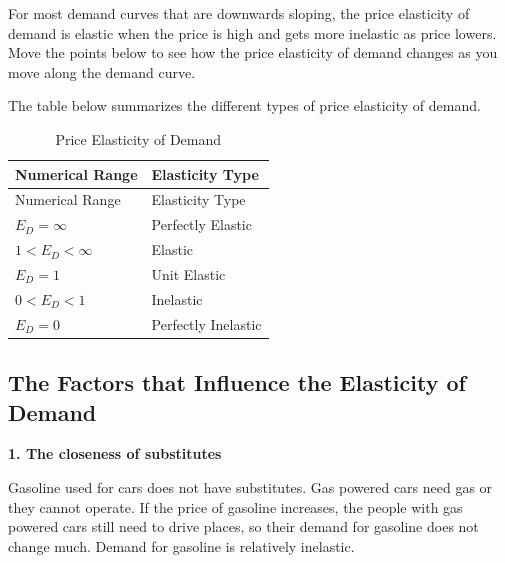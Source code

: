 \documentclass[
]{book}
\begin{document}
For most demand curves that are downwards sloping, the price elasticity of demand is elastic when the price is high and gets more inelastic as price lowers. Move the points below to see how the price elasticity of demand changes as you move along the demand curve.

The table below summarizes the different types of price elasticity of demand.

\begin{longtable}[]{@{}
  >{\centering\arraybackslash}p{}
  >{\centering\arraybackslash}p{}@{}}
\caption{Price Elasticity of Demand}\tabularnewline
\toprule\noalign{}
\begin{minipage}[b]{\linewidth}\centering
Numerical
Range
\end{minipage} & \begin{minipage}[b]{\linewidth}\centering
Elasticity
Type
\end{minipage} \\
\midrule\noalign{}
\endfirsthead
\toprule\noalign{}
\begin{minipage}[b]{\linewidth}\centering
Numerical
Range
\end{minipage} & \begin{minipage}[b]{\linewidth}\centering
Elasticity
Type
\end{minipage} \\
\midrule\noalign{}
\endhead
\bottomrule\noalign{}
\endlastfoot
\(E_D = \infty\) & Perfectly Elastic \\
\(1<E_D<\infty\) & Elastic \\
\(E_D = 1\) & Unit Elastic \\
\(0<E_D<1\) & Inelastic \\
\(E_D = 0\) & Perfectly Inelastic \\
\end{longtable}

\subsection{The Factors that Influence the Elasticity of Demand}\label{the-factors-that-influence-the-elasticity-of-demand}

\textbf{1. The closeness of substitutes}

Gasoline used for cars does not have substitutes. Gas powered cars need gas or they cannot operate. If the price of gasoline increases, the people with gas powered cars still need to drive places, so their demand for gasoline does not change much. Demand for gasoline is relatively inelastic.
\end{document}
